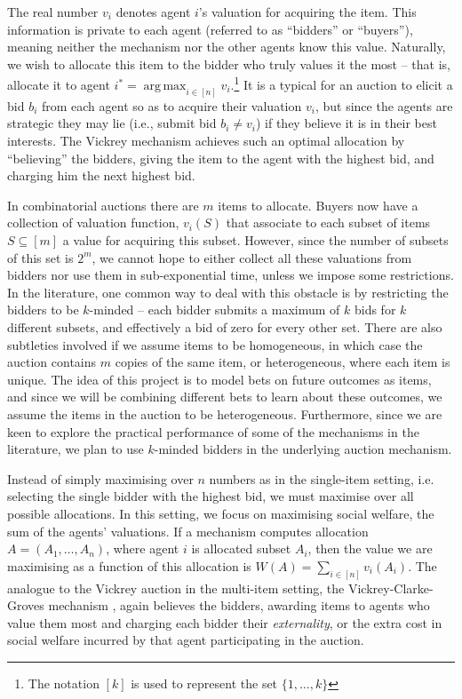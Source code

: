 \documentclass[10pt,a4paper]{article}
\theoremstyle{plain}
\theoremstyle{definition}
\DeclareMathOperator*{\argmax}{arg\,max}
\begin{document}
	The real number $v_i$ denotes agent $i$'s valuation for acquiring the item.
	This information is private to each agent (referred to as ``bidders'' or
	``buyers''), meaning neither the mechanism nor the other agents know this
	value. Naturally, we wish to allocate this item to the bidder who truly
	values it the most -- that is, allocate it to agent $i^* = \argmax_{i \in
	[n]} v_i$.\footnote{The notation $[k]$ is used to represent the set $\{ 1,
	\ldots, k \}$} It is a typical for an auction to elicit a bid $b_i$ from
	each agent so as to acquire their valuation $v_i$, but since the agents are
	strategic they may lie (i.e., submit bid $b_i \neq v_i$) if they believe it
	is in their best interests. The Vickrey mechanism \cite{Vickrey1961}
	achieves such an optimal allocation by ``believing'' the bidders, giving
	the item to the agent with the highest bid, and charging him the next
	highest bid.

	In combinatorial auctions there are $m$ items to allocate. Buyers now have
	a collection of valuation function, $v_i(S)$ that associate to each subset
	of items $S \subseteq [m]$ a value for acquiring this subset. However,
	since the number of subsets of this set is $2^m$, we cannot hope to either
	collect all these valuations from bidders nor use them in sub-exponential
	time, unless we impose some restrictions. In the literature, one common way
	to deal with this obstacle is by restricting the bidders to be $k$-minded
	-- each bidder submits a maximum of $k$ bids for $k$ different subsets, and
	effectively a bid of zero for every other set.  There are also subtleties
	involved if we assume items to be homogeneous, in which case the auction
	contains $m$ copies of the same item, or heterogeneous, where each item is
	unique. The idea of this project is to model bets on future outcomes as
	items, and since we will be combining different bets to learn about these
	outcomes, we assume the items in the auction to be heterogeneous.
	Furthermore, since we are keen to explore the practical performance of some
	of the mechanisms in the literature, we plan to use $k$-minded bidders in
	the underlying auction mechanism.

	Instead of simply maximising over $n$ numbers as in the single-item
	setting, i.e. selecting the single bidder with the highest bid, we must
	maximise over all possible allocations. In this setting, we focus on
	maximising social welfare, the sum of the agents' valuations. If a
	mechanism computes allocation $A = (A_1, \ldots, A_n)$, where agent $i$ is
	allocated subset $A_i$, then the value we are maximising as a function of
	this allocation is $W(A) = \sum_{i \in [n]} v_i(A_i)$. The analogue to the
	Vickrey auction in the multi-item setting, the Vickrey-Clarke-Groves
	mechanism \cite{Vickrey1961, Clarke1971, Groves1973}, again believes the
	bidders, awarding items to agents who value them most and charging each
	bidder their \emph{externality}, or the extra cost in social welfare
	incurred by that agent participating in the auction.
\end{document}

